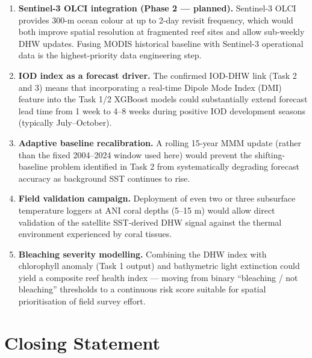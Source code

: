 \documentclass[12pt,a4paper]{report}
\begin{document}
\begin{enumerate}[leftmargin=*]
  \item \textbf{Sentinel-3 OLCI integration (Phase 2 — planned).}
  Sentinel-3 OLCI provides 300-m ocean colour at up to 2-day revisit frequency,
  which would both improve spatial resolution at fragmented reef sites and
  allow sub-weekly DHW updates. Fusing MODIS historical baseline with Sentinel-3
  operational data is the highest-priority data engineering step.

  \item \textbf{IOD index as a forecast driver.}
  The confirmed IOD-DHW link (Task 2 and 3) means that incorporating a real-time
  Dipole Mode Index (DMI) feature into the Task 1/2 XGBoost models could
  substantially extend forecast lead time from 1 week to 4--8 weeks during
  positive IOD development seasons (typically July--October).

  \item \textbf{Adaptive baseline recalibration.}
  A rolling 15-year MMM update (rather than the fixed 2004--2024 window used here)
  would prevent the shifting-baseline problem identified in Task 2 from
  systematically degrading forecast accuracy as background SST continues to rise.

  \item \textbf{Field validation campaign.}
  Deployment of even two or three subsurface temperature loggers at ANI coral
  depths (5--15 m) would allow direct validation of the satellite SST-derived
  DHW signal against the thermal environment experienced by coral tissues.

  \item \textbf{Bleaching severity modelling.}
  Combining the DHW index with chlorophyll anomaly (Task 1 output) and bathymetric
  light extinction could yield a composite reef health index — moving from binary
  ``bleaching / not bleaching'' thresholds to a continuous risk score suitable for
  spatial prioritisation of field survey effort.
\end{enumerate}

\section{Closing Statement}
\end{document}
